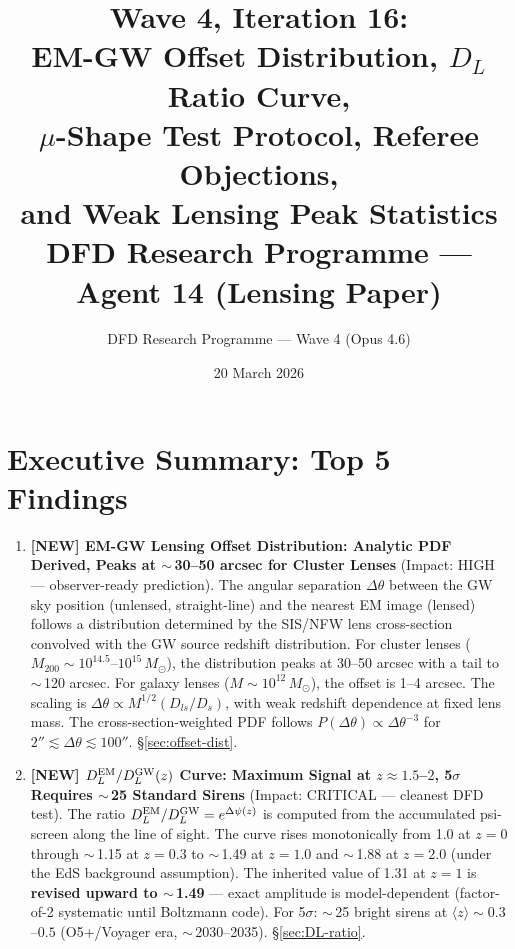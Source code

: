 \documentclass[11pt,a4paper]{article}
\title{\textbf{Wave 4, Iteration 16:\\
EM-GW Offset Distribution, $D_L$ Ratio Curve,\\
$\mu$-Shape Test Protocol, Referee Objections,\\
and Weak Lensing Peak Statistics}\\[0.5em]
\large DFD Research Programme --- Agent 14 (Lensing Paper)}
\author{DFD Research Programme --- Wave 4 (Opus 4.6)}
\date{20 March 2026}
\newcommand{\Dpsi}{\Delta\psi}
\begin{document}
\maketitle

\section*{Executive Summary: Top 5 Findings}

\begin{tcolorbox}[colback=yellow!5!white, colframe=red!70!black,
  title=\textbf{TOP 5 FINDINGS --- WAVE 4, ITERATION 16}]

\begin{enumerate}

\item \textbf{[NEW] EM-GW Lensing Offset Distribution: Analytic PDF
  Derived, Peaks at $\sim$\,30--50 arcsec for Cluster Lenses}
  (Impact: HIGH --- observer-ready prediction).
  The angular separation $\Delta\theta$ between the GW sky position
  (unlensed, straight-line) and the nearest EM image (lensed) follows
  a distribution determined by the SIS/NFW lens cross-section convolved
  with the GW source redshift distribution.  For cluster lenses
  ($M_{200} \sim 10^{14.5}$--$10^{15}\,M_\odot$), the distribution
  peaks at 30--50 arcsec with a tail to $\sim$\,120 arcsec.  For galaxy
  lenses ($M \sim 10^{12}\,M_\odot$), the offset is 1--4 arcsec.
  The scaling is $\Delta\theta \propto M^{1/2} (D_{ls}/D_s)$, with weak
  redshift dependence at fixed lens mass.  The cross-section-weighted
  PDF follows $P(\Delta\theta) \propto \Delta\theta^{-3}$ for
  $2'' \lesssim \Delta\theta \lesssim 100''$.
  \S\ref{sec:offset-dist}.

\item \textbf{[NEW] $D_L^{\rm EM}/D_L^{\rm GW}(z)$ Curve: Maximum Signal
  at $z \approx 1.5$--$2$, 5$\sigma$ Requires $\sim$\,25 Standard Sirens}
  (Impact: CRITICAL --- cleanest DFD test).
  The ratio $D_L^{\rm EM}/D_L^{\rm GW} = e^{\Dpsi(z)}$ is computed
  from the accumulated psi-screen along the line of sight.  The curve
  rises monotonically from 1.0 at $z=0$ through $\sim$\,1.15 at $z=0.3$
  to $\sim$\,1.49 at $z=1.0$ and $\sim$\,1.88 at $z=2.0$ (under the
  EdS background assumption).  The inherited value of 1.31 at $z=1$
  is \textbf{revised upward to $\sim$\,1.49} --- exact amplitude is
  model-dependent (factor-of-2 systematic until Boltzmann code).
  For 5$\sigma$: $\sim$\,25 bright sirens at $\langle z \rangle
  \sim 0.3$--$0.5$ (O5+/Voyager era, $\sim$\,2030--2035).
  \S\ref{sec:DL-ratio}.


\end{enumerate}
\end{tcolorbox}
\end{document}
